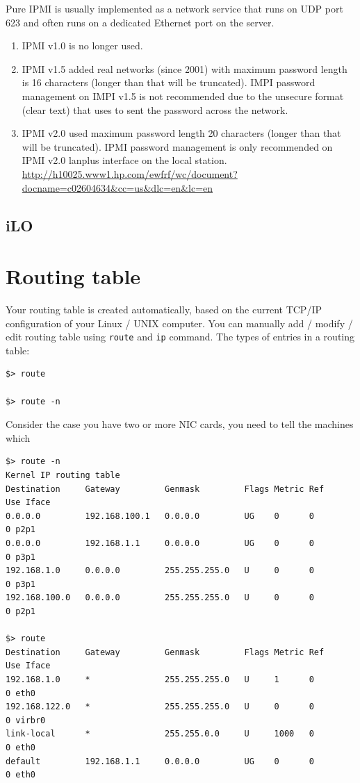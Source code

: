 Pure IPMI is usually implemented as a network service that runs on UDP port 623
and often runs on a dedicated Ethernet port on the server.

\begin{enumerate}
  \item  IPMI v1.0 is no longer used.

  \item IPMI v1.5 added real networks (since 2001) with maximum password length
  is 16 characters (longer than that will be truncated). IMPI password management on
IMPI v1.5 is not recommended due to the unsecure format (clear text) that uses
to sent the password across the network. 

  \item IPMI v2.0 used maximum password length 20 characters (longer than that
  will be truncated). IPMI password management is only recommended on IPMI v2.0 lanplus
interface on the local station.
\url{http://h10025.www1.hp.com/ewfrf/wc/document?docname=c02604634&cc=us&dlc=en&lc=en}
  
\end{enumerate}

\subsection{iLO}
\label{sec:iLO}


\section{Routing table}
\label{sec:routing_table}

Your routing table is created automatically, based on the current TCP/IP
configuration of your Linux / UNIX computer. You can manually add / modify /
edit routing table using \verb!route! and \verb!ip! command. The types of
entries in a routing table:

\begin{verbatim}
$> route

$> route -n
\end{verbatim}
Consider the case you have two or more NIC cards, you need to tell the machines
which 
\begin{verbatim}
$> route -n
Kernel IP routing table
Destination     Gateway         Genmask         Flags Metric Ref    Use Iface
0.0.0.0         192.168.100.1   0.0.0.0         UG    0      0        0 p2p1
0.0.0.0         192.168.1.1     0.0.0.0         UG    0      0        0 p3p1
192.168.1.0     0.0.0.0         255.255.255.0   U     0      0        0 p3p1
192.168.100.0   0.0.0.0         255.255.255.0   U     0      0        0 p2p1

$> route 
Destination     Gateway         Genmask         Flags Metric Ref    Use Iface
192.168.1.0     *               255.255.255.0   U     1      0        0 eth0
192.168.122.0   *               255.255.255.0   U     0      0        0 virbr0
link-local      *               255.255.0.0     U     1000   0        0 eth0
default         192.168.1.1     0.0.0.0         UG    0      0        0 eth0
\end{verbatim}

